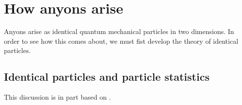 \documentclass[a4paper,10pt,oneside]{book}
\theoremstyle{plain}
\theoremstyle{definition}
\theoremstyle{remark}
\begin{document}







\chapter{How anyons arise}\label{chap:how anyons arise}


Anyons arise as identical quantum mechanical particles in two dimensions. In order to see how this comes about, we must fist develop the theory of identical particles.


\section{Identical particles and particle statistics}

This discussion is in part based on \cite{myrheim,bonderson}.
\end{document}
